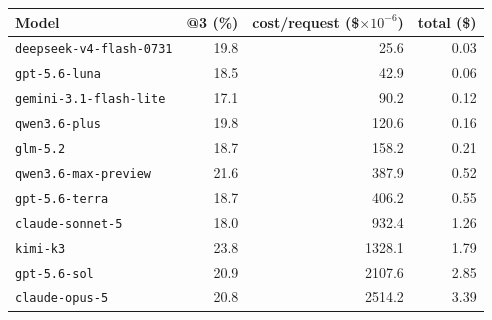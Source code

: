 \begin{tabular}{lrrr}
\toprule
Model & \usable{}@3 (\%) & cost/request (\$$\times 10^{-6}$) & total (\$) \\
\midrule
\texttt{deepseek-v4-flash-0731} & 19.8 & 25.6 & 0.03 \\
\texttt{gpt-5.6-luna} & 18.5 & 42.9 & 0.06 \\
\texttt{gemini-3.1-flash-lite} & 17.1 & 90.2 & 0.12 \\
\texttt{qwen3.6-plus} & 19.8 & 120.6 & 0.16 \\
\texttt{glm-5.2} & 18.7 & 158.2 & 0.21 \\
\texttt{qwen3.6-max-preview} & 21.6 & 387.9 & 0.52 \\
\texttt{gpt-5.6-terra} & 18.7 & 406.2 & 0.55 \\
\texttt{claude-sonnet-5} & 18.0 & 932.4 & 1.26 \\
\texttt{kimi-k3} & 23.8 & 1328.1 & 1.79 \\
\texttt{gpt-5.6-sol} & 20.9 & 2107.6 & 2.85 \\
\texttt{claude-opus-5} & 20.8 & 2514.2 & 3.39 \\
\bottomrule
\end{tabular}
